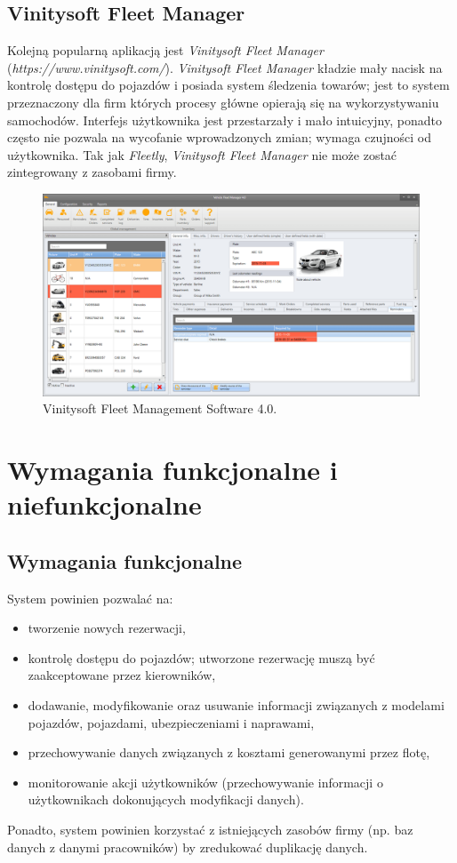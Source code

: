 \documentclass[eng,printmode,openany]{mgr}
\begin{document}
	\section{Vinitysoft Fleet Manager}
	Kolejną popularną aplikacją jest \textit{Vinitysoft Fleet Manager} (\textit{https://www.vinitysoft.com/}). \textit{Vinitysoft Fleet Manager} kładzie mały nacisk na kontrolę dostępu do pojazdów i posiada system śledzenia towarów; jest to system przeznaczony dla firm których procesy główne opierają się na wykorzystywaniu samochodów. Interfejs użytkownika jest przestarzały i mało intuicyjny, ponadto często nie pozwala na wycofanie wprowadzonych zmian; wymaga czujności od użytkownika. Tak jak \textit{Fleetly}, \textit{Vinitysoft Fleet Manager} nie może zostać zintegrowany z zasobami firmy.
	\begin{figure}[H]
		\centering
		\includegraphics[width=\textwidth]{images/vinitysoft.png}
		\caption{Vinitysoft Fleet Management Software 4.0.}		
	\end{figure}
	\newpage
	\chapter{Wymagania funkcjonalne i niefunkcjonalne}
	\section{Wymagania funkcjonalne}
	System powinien pozwalać na:
	\begin{itemize}
		\item tworzenie nowych rezerwacji,
		\item kontrolę dostępu do pojazdów; utworzone rezerwację muszą być zaakceptowane przez kierowników,
		\item dodawanie, modyfikowanie oraz usuwanie informacji związanych z modelami pojazdów, pojazdami, ubezpieczeniami i naprawami,
		\item przechowywanie danych związanych z kosztami generowanymi przez flotę,
		\item monitorowanie akcji użytkowników (przechowywanie informacji o użytkownikach dokonujących modyfikacji danych).
	\end{itemize}
	Ponadto, system powinien korzystać z istniejących zasobów firmy (np. baz danych z danymi pracowników) by zredukować duplikację danych.
	
\end{document}
